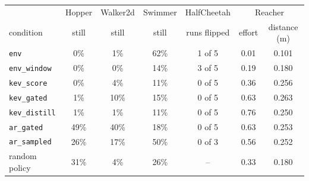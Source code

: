 \begin{tabular}{@{}lcccccc@{}}
\toprule
 & Hopper & Walker2d & Swimmer & HalfCheetah & \multicolumn{2}{c}{Reacher} \\ \cmidrule(lr){2-2}\cmidrule(lr){3-3}\cmidrule(lr){4-4}\cmidrule(lr){5-5}\cmidrule(l){6-7}
condition & still & still & still & runs flipped & effort & distance (m) \\ \midrule
\texttt{env} & 0\% & 1\% & 62\% & 1 of 5 & 0.01 & 0.101 \\
\texttt{env\_window} & 0\% & 0\% & 14\% & 3 of 5 & 0.19 & 0.180 \\
\texttt{kev\_score} & 0\% & 4\% & 11\% & 0 of 5 & 0.36 & 0.256 \\
\texttt{kev\_gated} & 1\% & 10\% & 15\% & 0 of 5 & 0.63 & 0.263 \\
\texttt{kev\_distill} & 1\% & 1\% & 11\% & 0 of 5 & 0.76 & 0.250 \\
\texttt{ar\_gated} & 49\% & 40\% & 18\% & 0 of 5 & 0.63 & 0.253 \\
\texttt{ar\_sampled} & 26\% & 17\% & 50\% & 0 of 3 & 0.56 & 0.252 \\ \midrule
random policy & 31\% & 4\% & 26\% & -- & 0.33 & 0.180 \\
\bottomrule
\end{tabular}
